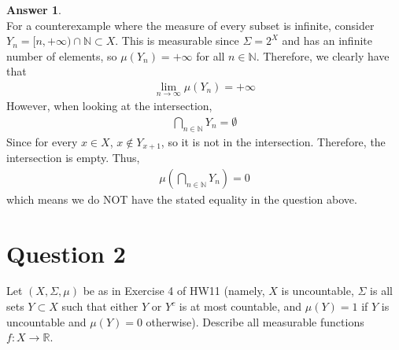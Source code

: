 \documentclass[10pt,a4paper]{article}
\theoremstyle{definition}
\newtheorem*{answer*}{Answer}
\theoremstyle{definition}
\numberwithin{equation}{section}
\begin{document}
\begin{answer*}$ $
\\For a counterexample where the measure of every subset is infinite, consider $Y_n = [n, +\infty) \cap \mathbb{N} \subset X$. This is measurable since $\Sigma = 2^X$ and has an infinite number of elements, so $\mu(Y_n) = +\infty$ for all $n \in \mathbb{N}$. Therefore, we clearly have that
\begin{align*}
\lim_{n \to \infty} \mu(Y_n) = +\infty
\end{align*}
However, when looking at the intersection, 
\begin{align*}
\bigcap_{n \in \mathbb{N}} Y_n = \emptyset
\end{align*}
Since for every $x \in X$, $x \not \in Y_{x + 1}$, so it is not in the intersection. Therefore, the intersection is empty. Thus, 
\begin{align*}
\mu\left(\bigcap_{n \in \mathbb{N}} Y_n\right) = 0
\end{align*}
which means we do NOT have the stated equality in the question above. 
\end{answer*}

\section*{Question 2}
Let $(X, \Sigma, \mu)$ be as in Exercise 4 of HW11 (namely, $X$ is uncountable, $\Sigma$ is all sets $Y \subset X$ such that either $Y$ or $Y^c$ is at most countable, and $\mu(Y) = 1$ if $Y$ is uncountable and $\mu(Y) = 0$ otherwise). Describe all measurable functions $f: X \to \mathbb{R}$. 
\end{document}
